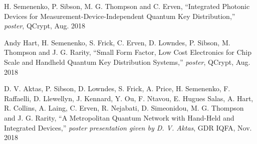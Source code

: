 {H. Semenenko, P. Sibson, M. G. Thompson and C. Erven, ``Integrated Photonic Devices for Measurement-Device-Independent Quantum Key Distribution,'' \textit{poster}, QCrypt, Aug. 2018

Andy Hart, H. Semenenko, S. Frick, C. Erven, D. Lowndes, P. Sibson, M. Thompson and J. G. Rarity, ``Small Form Factor, Low Cost Electronics for Chip Scale and Handheld Quantum Key Distribution Systems,'' \textit{poster}, QCrypt, Aug. 2018

D. V. Aktas, P. Sibson, D. Lowndes, S. Frick, A. Price, H. Semenenko, F. Raffaelli, D. Llewellyn, J. Kennard, Y. Ou, F. Ntavou, E. Hugues Salas, A. Hart, R. Collins, A. Laing, C. Erven, R. Nejabati, D. Simeonidou, M. G. Thompson and J. G. Rarity, ``A Metropolitan Quantum Network with Hand-Held and Integrated Devices,'' \textit{poster presentation given by D. V. Aktas}, GDR IQFA, Nov. 2018
}
\clearpage